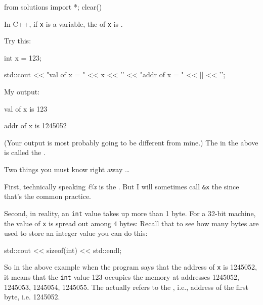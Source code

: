 \begin{python0}
from solutions import *; clear()
\end{python0}

In C++, if \verb!x! is a variable, the  of \verb!x! is .

Try this:

\begin{consolethree}[escapeinside=||]
int x = 123;

std::cout << "val of x = " << x << '\n'
          << "addr of x = " << || << '\n';
\end{consolethree}

My output:

\begin{consolethree}[escapeinside=||]
val of x is 123

addr of x is 1245052
\end{consolethree}
(Your output is most probably going to be different from mine.) The \EMPHASIZE{\&} in the above is called the .

Two things you must know right away \ldots{}

First, technically speaking \emph{\&x} is the \emph{}\texttt{}. But I will sometimes call \texttt{\&x} the \texttt{} since that's the common practice.

Second, in reality, an \texttt{int} value takes up more than 1 byte. For a 32-bit machine, the value of \texttt{x} is spread out among 4 bytes: Recall that to see how many bytes are used to store an integer value you can do this:

\begin{consolethree}[escapeinside=||]
std::cout << sizeof(int) << std::endl;
\end{consolethree}
So in the above example when the program says that the address of \texttt{x} is 1245052, it means that the \texttt{int} value 123 occupies the memory at addresses 1245052, 1245053, 1245054, 1245055. The \texttt{} actually refers to the , i.e., address of the first byte, i.e. 1245052.


